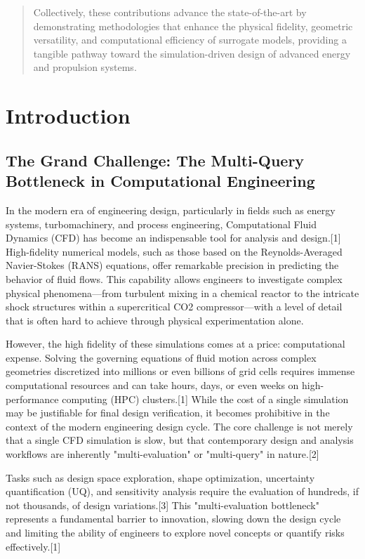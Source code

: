 \documentclass[12pt, a4paper]{report}
\begin{document}
\begin{abstract}
Collectively, these contributions advance the state-of-the-art by demonstrating methodologies that enhance the physical fidelity, geometric versatility, and computational efficiency of surrogate models, providing a tangible pathway toward the simulation-driven design of advanced energy and propulsion systems.
\end{abstract}

\tableofcontents

\chapter{Introduction}

\section{The Grand Challenge: The Multi-Query Bottleneck in Computational Engineering}

In the modern era of engineering design, particularly in fields such as energy systems, turbomachinery, and process engineering, Computational Fluid Dynamics (CFD) has become an indispensable tool for analysis and design.[1] High-fidelity numerical models, such as those based on the Reynolds-Averaged Navier-Stokes (RANS) equations, offer remarkable precision in predicting the behavior of fluid flows. This capability allows engineers to investigate complex physical phenomena—from turbulent mixing in a chemical reactor to the intricate shock structures within a supercritical CO2 compressor—with a level of detail that is often hard to achieve through physical experimentation alone.

However, the high fidelity of these simulations comes at a price: computational expense. Solving the governing equations of fluid motion across complex geometries discretized into millions or even billions of grid cells requires immense computational resources and can take hours, days, or even weeks on high-performance computing (HPC) clusters.[1] While the cost of a single simulation may be justifiable for final design verification, it becomes prohibitive in the context of the modern engineering design cycle. The core challenge is not merely that a single CFD simulation is slow, but that contemporary design and analysis workflows are inherently "multi-evaluation" or "multi-query" in nature.[2]

Tasks such as design space exploration, shape optimization, uncertainty quantification (UQ), and sensitivity analysis require the evaluation of hundreds, if not thousands, of design variations.[3] This "multi-evaluation bottleneck" represents a fundamental barrier to innovation, slowing down the design cycle and limiting the ability of engineers to explore novel concepts or quantify risks effectively.[1]
\end{document}
